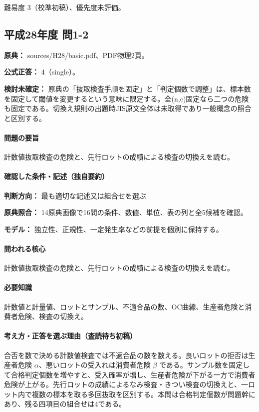 \par 難易度 3（校準初稿）、優先度未評価。

\subsection{平成28年度 問1-2}
\label{q:h28-reg-basic-1-2}

\noindent\textbf{原典：} sources/H28/basic.pdf、PDF物理2頁。

\textbf{公式正答：} 4（single）。

\par\textbf{検討未確定：} 原典の「抜取検査手順を固定」と「判定個数で調整」は、標本数を固定して閾値を変更するという意味に限定する。全(n,c)固定なら二つの危険も固定である。切換え規則の出題時JIS原文全体は未取得であり一般概念の照合と区別する。

\paragraph{問題の要旨} 計数値抜取検査の危険と、先行ロットの成績による検査の切換えを読む。

\paragraph{確認した条件・記述（独自要約）}\mbox{}\par

\noindent\textbf{判断方向：} 最も適切な記述又は組合せを選ぶ\par

\noindent\textbf{原典照合：} 14原典画像で16問の条件、数値、単位、表の列と全5候補を確認。\par

\noindent\textbf{モデル：} 独立性、正規性、一定発生率などの前提を個別に保持する。\par

\paragraph{問われる核心} 計数値抜取検査の危険と、先行ロットの成績による検査の切換えを読む。

\paragraph{必要知識} 計数値と計量値、ロットとサンプル、不適合品の数、OC曲線、生産者危険と消費者危険、検査の切換え。

\paragraph{考え方・正答を選ぶ理由（査読待ち初稿）} 合否を数で決める計数値検査では不適合品の数を数える。良いロットの拒否は生産者危険 \(\alpha\)、悪いロットの受入れは消費者危険 \(\beta\) である。サンプル数を固定して合格判定個数を増やすと、受入確率が増し、生産者危険が下がる一方で消費者危険が上がる。先行ロットの成績によるなみ検査・きつい検査の切換えと、一ロット内で複数の標本を取る多回抜取を区別する。本問は合格判定個数が問題幹にあり、残る四項目の組合せは4である。

